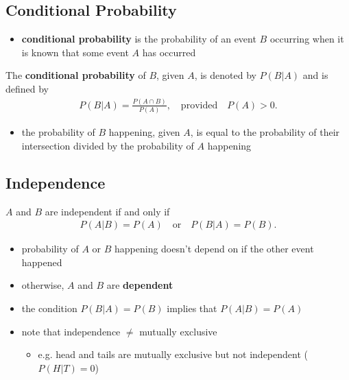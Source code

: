 \documentclass[10pt]{article}
\begin{document}
\subsection{Conditional Probability}
\begin{itemize}
    \item \textbf{conditional probability} is the probability of an event $B$ occurring when it is known that some event $A$ has occurred
\end{itemize}
\begin{definition}
    The \textbf{conditional probability} of $B$, given $A$, is denoted by $P(B|A)$ and is defined by
    \begin{align*}
        P(B|A) = \frac{P(A \cap B)}{P(A)}, \quad \text{provided} \quad P(A) > 0
    .\end{align*}
\end{definition}
\begin{itemize}
    \item the probability of $B$ happening, given $A$, is equal to the probability of their intersection divided by the probability of $A$ happening
\end{itemize}

\subsection{Independence}
\begin{definition}
    $A$ and $B$ are independent if and only if 
        \begin{align*}
            P(A|B) = P(A) \quad \text{or} \quad P(B|A) = P(B)
        .\end{align*}
        \begin{itemize}
            \item probability of $A$ or $B$ happening doesn't depend on if the other event happened
            \item otherwise, $A$ and $B$ are \textbf{dependent}
        \end{itemize}
\end{definition}
\begin{itemize}
    \item the condition $P(B|A) = P(B)$ implies that $P(A|B) = P(A)$
    \item note that independence $\neq$ mutually exclusive
        \begin{itemize}
            \item e.g. head and tails are mutually exclusive but not independent ($P(H|T) = 0$)
        \end{itemize}
\end{itemize}
\end{document}
